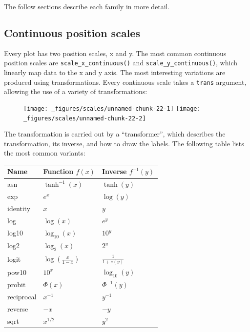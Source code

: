 The follow sections describe each family in more detail.

\subsection{Continuous position scales}\label{sub:scale-position}

Every plot has two position scales, x and y. 
 The most common continuous position scales
are \texttt{scale\_x\_continuous()} and \texttt{scale\_y\_continuous()},
which linearly map data to the x and y axis. 
  The most
interesting variations are produced using transformations. Every
continuous scale takes a \texttt{trans} argument, allowing the use of a
variety of transformations:

\begin{Shaded}
\begin{Highlighting}[]
\StringTok{ }
\StringTok{  }\NormalTok{() +}\StringTok{ }
\StringTok{  }\NormalTok{(} \NormalTok{)}

\StringTok{ }
\StringTok{  }\NormalTok{() +}\StringTok{ }
\StringTok{  }\NormalTok{(} \NormalTok{) +}
\StringTok{  }\NormalTok{(} \NormalTok{)}
\end{Highlighting}
\end{Shaded}

\begin{figure}[H]
  \texttt{[image: \_figures/scales/unnamed-chunk-22-1]}%
  \texttt{[image: \_figures/scales/unnamed-chunk-22-2]}
\end{figure}

The transformation is carried out by a ``transformer'', which describes
the transformation, its inverse, and how to draw the labels. The
following table lists the most common variants:

\begin{longtable}[c]{@{}lll@{}}
\toprule
Name & Function \(f(x)\) & Inverse \(f^{-1}(y)\)\tabularnewline
\midrule
\endhead
asn & \(\tanh^{-1}(x)\) & \(\tanh(y)\)\tabularnewline
exp & \(e ^ x\) & \(\log(y)\)\tabularnewline
identity & \(x\) & \(y\)\tabularnewline
log & \(\log(x)\) & \(e ^ y\)\tabularnewline
log10 & \(\log_{10}(x)\) & \(10 ^ y\)\tabularnewline
log2 & \(\log_2(x)\) & \(2 ^ y\)\tabularnewline
logit & \(\log(\frac{x}{1 - x})\) &
\(\frac{1}{1 + e(y)}\)\tabularnewline
pow10 & \(10^x\) & \(\log_{10}(y)\)\tabularnewline
probit & \(\Phi(x)\) & \(\Phi^{-1}(y)\)\tabularnewline
reciprocal & \(x^{-1}\) & \(y^{-1}\)\tabularnewline
reverse & \(-x\) & \(-y\)\tabularnewline
sqrt & \(x^{1/2}\) & \(y ^ 2\)\tabularnewline
\bottomrule
\end{longtable}

